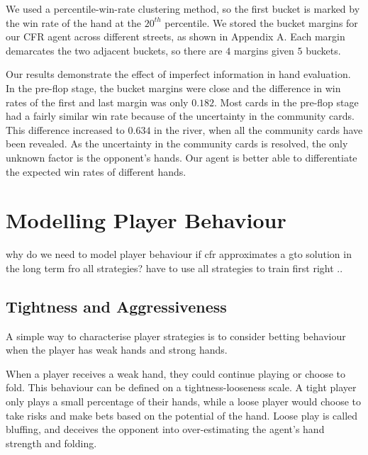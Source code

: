 \documentclass{article}
\begin{document}
We used a percentile-win-rate clustering method, so the first bucket is marked by the win rate of the hand at the $20^{th}$ percentile. We stored the bucket margins for our CFR agent across different streets, as shown in Appendix A. Each margin demarcates the two adjacent buckets, so there are $4$ margins given $5$ buckets.

Our results demonstrate the effect of imperfect information in hand evaluation. In the pre-flop stage, the bucket margins were close and the difference in win rates of the first and last margin was only $0.182$. Most cards in the pre-flop stage had a fairly similar win rate because of the uncertainty in the community cards. This difference increased to $0.634$ in the river, when all the community cards have been revealed. As the uncertainty in the community cards is resolved, the only unknown factor is the opponent's hands. Our agent is better able to differentiate the expected win rates of different hands.


\section{Modelling Player Behaviour}
why do we need to model player behaviour if cfr approximates a gto solution in the long term fro all strategies? have to use all strategies to train first right ..

\subsection{Tightness and Aggressiveness}
A simple way to characterise player strategies is to consider betting behaviour when the player has weak hands and strong hands. 

When a player receives a weak hand, they could continue playing or choose to fold. This behaviour can be defined on a tightness-looseness scale. A tight player only plays a small percentage of their hands, while a loose player would choose to take risks and make bets based on the potential of the hand. Loose play is called bluffing, and deceives the opponent into over-estimating the agent's hand strength and folding.
\end{document}
